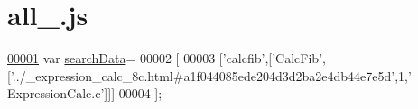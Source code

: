 \hypertarget{all__0_8js_source}{\section{all\+\_.\+js}
\label{all__0_8js_source}
}

\begin{DoxyCode}
\hypertarget{all__0_8js_source_l00001}{}\hyperlink{all__0_8js_ad01a7523f103d6242ef9b0451861231e}{00001} var \hyperlink{all__0_8js_ad01a7523f103d6242ef9b0451861231e}{searchData}=
00002 [
00003   [\textcolor{stringliteral}{'calcfib'},[\textcolor{stringliteral}{'CalcFib'},[\textcolor{stringliteral}{'../\_expression\_calc\_8c.html#a1f044085ede204d3d2ba2e4db44e7e5d'},1,\textcolor{stringliteral}{'
      ExpressionCalc.c'}]]]
00004 ];
\end{DoxyCode}
